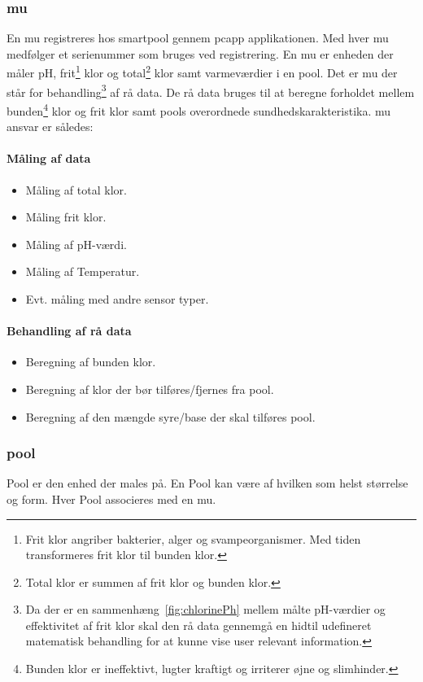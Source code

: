 \subsubsection{\gls{mu}}
En \gls{mu} registreres hos \gls{smartpool} gennem \gls{pcapp} applikationen. Med hver \gls{mu} medfølger et serienummer som bruges ved registrering. En \gls{mu} er enheden der måler pH, frit\footnote{Frit klor angriber bakterier, alger og svampeorganismer. Med tiden transformeres frit klor til bunden klor.} klor og total\footnote{Total klor er summen af frit klor og bunden klor.} klor samt varmeværdier i en \gls{pool}. Det er \gls{mu} der står for behandling\footnote{Da der er en sammenhæng~\ref{fig:chlorinePh} mellem målte pH-værdier og effektivitet af frit klor skal den rå data gennemgå en hidtil udefineret matematisk behandling for at kunne vise \gls{user} relevant information.} af rå data. De rå data bruges til at beregne forholdet mellem bunden\footnote{Bunden klor er ineffektivt, lugter kraftigt og irriterer øjne og slimhinder.} klor og frit klor samt \glspl{pool} overordnede sundhedskarakteristika. \gls{mu} ansvar er således:

\paragraph{Måling af data}
\begin{itemize}
	\item Måling af total klor.
	\item Måling frit klor.
	\item Måling af pH-værdi.
	\item Måling af Temperatur.
	\item Evt. måling med andre sensor typer.
\end{itemize}

\paragraph{Behandling af rå data}
\begin{itemize}
	\item Beregning af bunden klor.
	\item Beregning af klor der bør tilføres/fjernes fra \gls{pool}.
	\item Beregning af den mængde syre/base der skal tilføres \gls{pool}.
\end{itemize}

\subsubsection{\gls{pool}}
Pool er den enhed der males på. En Pool kan være af hvilken som helst størrelse og form. Hver Pool associeres med en \gls{mu}.